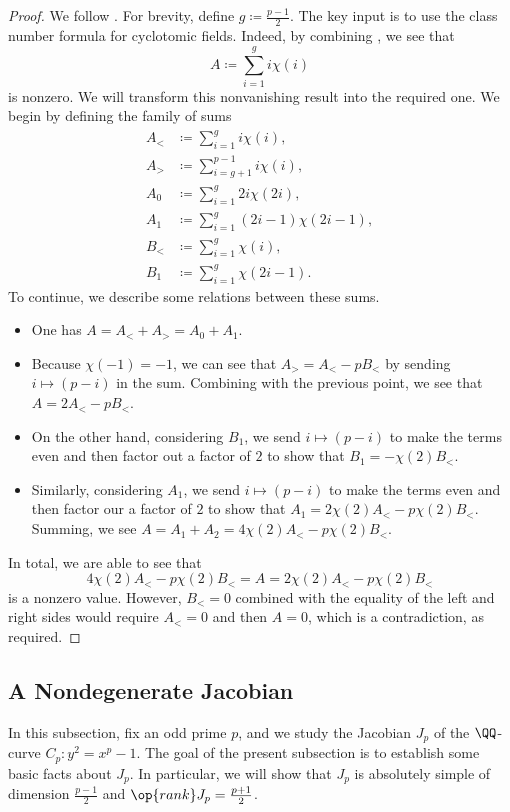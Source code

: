 \documentclass{article}
\begin{document}
\begin{proof}
	We follow \cite[Lemma~4.3]{kubota-cm-type}. For brevity, define $g\coloneqq\frac{p-1}2$. The key input is to use the class number formula for cyclotomic fields. Indeed, by combining \cite[Proposition~4.1, Theorem~4.2, Corollary~4.4]{washington-cyclotomic-field}, we see that
	\[A\coloneqq\sum_{i=1}^gi\chi(i)\]
	is nonzero. We will transform this nonvanishing result into the required one. We begin by defining the family of sums
	\begin{align*}
		A_< &\coloneqq \sum_{i=1}^gi\chi(i), \\
		A_> &\coloneqq \sum_{i=g+1}^{p-1}i\chi(i), \\
		A_0 &\coloneqq \sum_{i=1}^g2i\chi(2i), \\
		A_1 &\coloneqq \sum_{i=1}^g(2i-1)\chi(2i-1), \\
		B_< &\coloneqq \sum_{i=1}^g\chi(i), \\
		B_1 &\coloneqq \sum_{i=1}^g\chi(2i-1).
	\end{align*}
	To continue, we describe some relations between these sums.
	\begin{itemize}
		\item One has $A=A_<+A_>=A_0+A_1$.
		\item Because $\chi(-1)=-1$, we can see that $A_>=A_<-pB_<$ by sending $i\mapsto(p-i)$ in the sum. Combining with the previous point, we see that $A=2A_<-pB_<$.
		\item On the other hand, considering $B_1$, we send $i\mapsto(p-i)$ to make the terms even and then factor out a factor of $2$ to show that $B_1=-\chi(2)B_<$.
		\item Similarly, considering $A_1$, we send $i\mapsto(p-i)$ to make the terms even and then factor our a factor of $2$ to show that $A_1=2\chi(2)A_<-p\chi(2)B_<$. Summing, we see $A=A_1+A_2=4\chi(2)A_<-p\chi(2)B_<$.
	\end{itemize}
	In total, we are able to see that
	\[4\chi(2)A_<-p\chi(2)B_<=A=2\chi(2)A_<-p\chi(2)B_<\]
	is a nonzero value. However, $B_<=0$ combined with the equality of the left and right sides would require $A_<=0$ and then $A=0$, which is a contradiction, as required.
\end{proof}

\subsection{A Nondegenerate Jacobian}
In this subsection, fix an odd prime $p$, and we study the Jacobian $J_p$ of the $\QQ$-curve $C_p\colon y^2=x^p-1$. The goal of the present subsection is to establish some basic facts about $J_p$. In particular, we will show that $J_p$ is absolutely simple of dimension $\frac{p-1}2$ and $\op{rank}J_p=\frac{p+1}2$.
\end{document}
